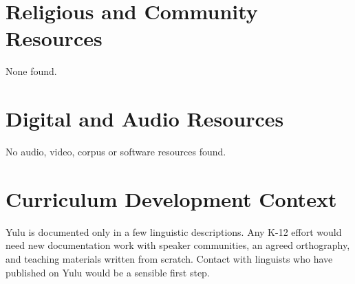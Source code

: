\documentclass[12pt]{article}
\begin{document}
\section{Religious and Community Resources}
None found.

\section{Digital and Audio Resources}
No audio, video, corpus or software resources found.

\section{Curriculum Development Context}
Yulu is documented only in a few linguistic descriptions. Any K-12 effort would need new documentation work with speaker communities, an agreed orthography, and teaching materials written from scratch. Contact with linguists who have published on Yulu would be a sensible first step.
\end{document}
